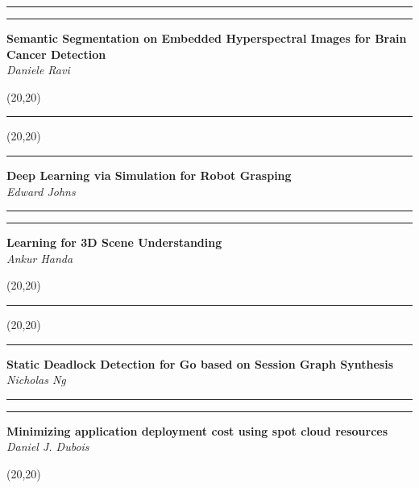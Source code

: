 \documentclass[11pt]{article}
\newcommand{\talk}[1]{\Large\flushleft\textbf{#1}\\}
\newcommand{\speaker}[1]{\textit{#1}\\}
\newcommand{\separator}{\noindent\rule{\linewidth}{0.1mm}}
\newcommand{\votebox}{\vspace{-5cm}\noindent\hfill\framebox(20,20){}}
\newcommand{\hstrut}{\noindent\color{iclightblue}\rule{\linewidth}{0pt}}
\begin{document}
\begin{minipage}[t]{0.02\linewidth}
\hstrut%
\end{minipage}
\begin{minipage}[t]{0.49\linewidth}
\separator%
\talk{Semantic Segmentation on Embedded Hyperspectral Images for Brain Cancer
      Detection}
\speaker{Daniele Ravi}
\end{minipage}
\vfill
\noindent
\begin{minipage}[b]{0.49\linewidth}
\votebox%
\end{minipage}
\begin{minipage}[b]{0.02\linewidth}
\hstrut%
\end{minipage}
\begin{minipage}[b]{0.49\linewidth}
\votebox%
\end{minipage}
\noindent
\begin{minipage}[t]{0.49\linewidth}
\separator%
\talk{Deep Learning via Simulation for Robot Grasping}
\speaker{Edward Johns}
\end{minipage}
\begin{minipage}[t]{0.02\linewidth}
\hstrut%
\end{minipage}
\begin{minipage}[t]{0.49\linewidth}
\separator%
\talk{Learning for 3D Scene Understanding}
\speaker{Ankur Handa}
\end{minipage}
\vfill
\noindent
\begin{minipage}[b]{0.49\linewidth}
\votebox%
\end{minipage}
\begin{minipage}[b]{0.02\linewidth}
\hstrut%
\end{minipage}
\begin{minipage}[b]{0.49\linewidth}
\votebox%
\end{minipage}
\noindent
\begin{minipage}[t]{0.49\linewidth}
\separator%
\talk{Static Deadlock Detection for Go based on Session Graph Synthesis}
\speaker{Nicholas Ng}
\end{minipage}
\begin{minipage}[t]{0.02\linewidth}
\hstrut%
\end{minipage}
\begin{minipage}[t]{0.49\linewidth}
\separator%
\talk{Minimizing application deployment cost using spot cloud resources}
\speaker{Daniel J. Dubois}
\end{minipage}
\vfill
\noindent
\begin{minipage}[b]{0.49\linewidth}
\votebox%
\end{minipage}
\end{document}

